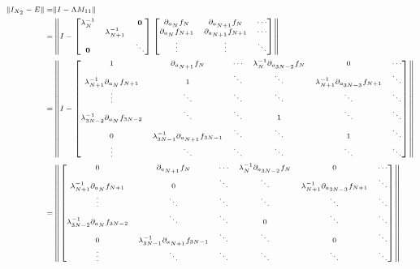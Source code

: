 \begin{enumerate}
\begin{equation}
  \scriptsize
  \begin{split}
    \|I_{X_2} - E \| =& \| I - \Lambda M_{11}\| \\
    =& \left\| I -
    \begin{bmatrix}
      \lambda^{-1}_N & & \mathbf{0} \\
      & \lambda^{-1}_{N+1} &\\
      \mathbf{0} &  & \ddots
    \end{bmatrix}
    \begin{bmatrix}
      \partial_{a_{N}} f_{N} & \partial_{a_{N+1}} f_{N}  & \cdots \\
      \partial_{a_{N}} f_{N+1} & \partial_{a_{N+1}} f_{N+1}  & \cdots \\
      \vdots & \vdots & \ddots \\
    \end{bmatrix}
    \right\|\\
    =& \left \|
    I - \begin{bmatrix}
      1 & \partial_{a_{N+1}} f_{N}  & \cdots & \lambda^{-1}_{N}\partial_{a_{3N-2}}f_N & 0 & \cdots \\
      \lambda^{-1}_{N+1}\partial_{a_{N}} f_{N+1} & 1  & \ddots & \ddots & \lambda^{-1}_{N+1}\partial_{a_{3N-3}}f_{N+1} & \ddots \\
      \vdots & \ddots & \ddots & \ddots & \ddots & \ddots \\
      \lambda^{-1}_{3N-2}\partial_{a_{N}} f_{3N-2} & \ddots & \ddots & 1 & \ddots & \ddots\\
      0 & \lambda^{-1}_{3N-1}\partial_{a_{N+1}} f_{3N-1}& \ddots & \ddots & 1 & \ddots\\
      \vdots & \ddots & \ddots & \ddots & \ddots & \ddots\\
    \end{bmatrix}
    \right \|\\
    =&\left\|
    \begin{bmatrix}
      0 & \partial_{a_{N+1}} f_{N}  & \cdots & \lambda^{-1}_{N}\partial_{a_{3N-2}}f_N & 0 & \cdots \\
      \lambda^{-1}_{N+1}\partial_{a_{N}} f_{N+1} & 0  & \ddots & \ddots & \lambda^{-1}_{N+1}\partial_{a_{3N-3}}f_{N+1} & \ddots \\
      \vdots & \ddots & \ddots & \ddots & \ddots & \ddots \\
      \lambda^{-1}_{3N-2}\partial_{a_{N}} f_{3N-2} & \ddots & \ddots & 0 & \ddots & \ddots\\
      0 & \lambda^{-1}_{3N-1}\partial_{a_{N+1}} f_{3N-1}& \ddots & \ddots & 0 & \ddots\\
      \vdots & \ddots & \ddots & \ddots & \ddots & \ddots\\
    \end{bmatrix}
    \right \|
  \end{split}
\end{equation}


\end{enumerate}
